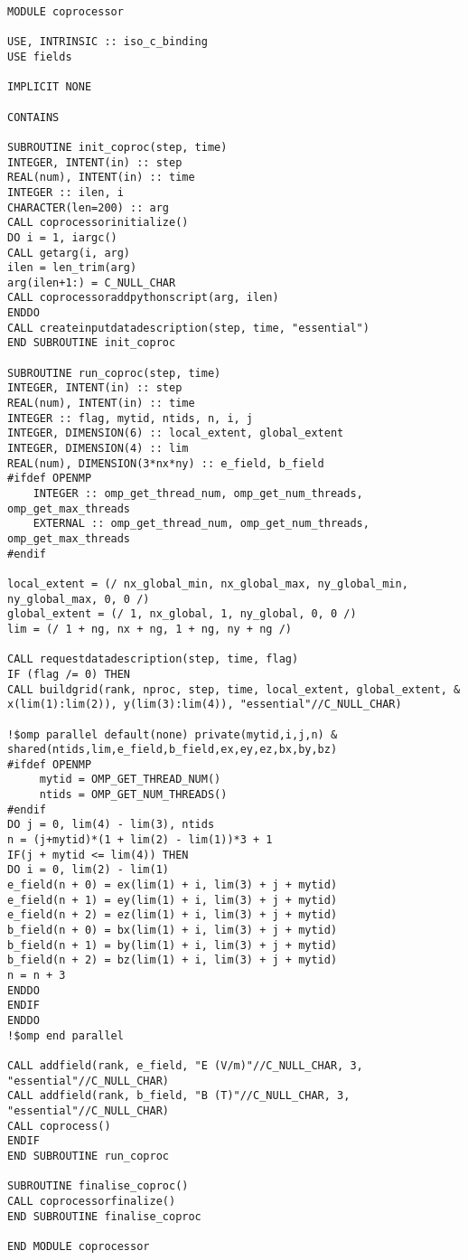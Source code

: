 \begin{lstlisting}[style=FORTRAN, caption=Fortran adaptor for ParaView Catalyst]
MODULE coprocessor

USE, INTRINSIC :: iso_c_binding
USE fields

IMPLICIT NONE

CONTAINS

SUBROUTINE init_coproc(step, time)
INTEGER, INTENT(in) :: step
REAL(num), INTENT(in) :: time
INTEGER :: ilen, i
CHARACTER(len=200) :: arg
CALL coprocessorinitialize()
DO i = 1, iargc()
CALL getarg(i, arg)
ilen = len_trim(arg)
arg(ilen+1:) = C_NULL_CHAR
CALL coprocessoraddpythonscript(arg, ilen)
ENDDO
CALL createinputdatadescription(step, time, "essential")
END SUBROUTINE init_coproc

SUBROUTINE run_coproc(step, time)
INTEGER, INTENT(in) :: step
REAL(num), INTENT(in) :: time
INTEGER :: flag, mytid, ntids, n, i, j
INTEGER, DIMENSION(6) :: local_extent, global_extent
INTEGER, DIMENSION(4) :: lim
REAL(num), DIMENSION(3*nx*ny) :: e_field, b_field
#ifdef OPENMP
    INTEGER :: omp_get_thread_num, omp_get_num_threads, omp_get_max_threads
    EXTERNAL :: omp_get_thread_num, omp_get_num_threads, omp_get_max_threads
#endif

local_extent = (/ nx_global_min, nx_global_max, ny_global_min, ny_global_max, 0, 0 /)
global_extent = (/ 1, nx_global, 1, ny_global, 0, 0 /)
lim = (/ 1 + ng, nx + ng, 1 + ng, ny + ng /)

CALL requestdatadescription(step, time, flag)
IF (flag /= 0) THEN
CALL buildgrid(rank, nproc, step, time, local_extent, global_extent, &
x(lim(1):lim(2)), y(lim(3):lim(4)), "essential"//C_NULL_CHAR)

!$omp parallel default(none) private(mytid,i,j,n) &
shared(ntids,lim,e_field,b_field,ex,ey,ez,bx,by,bz)
#ifdef OPENMP
     mytid = OMP_GET_THREAD_NUM()
     ntids = OMP_GET_NUM_THREADS()
#endif
DO j = 0, lim(4) - lim(3), ntids
n = (j+mytid)*(1 + lim(2) - lim(1))*3 + 1
IF(j + mytid <= lim(4)) THEN
DO i = 0, lim(2) - lim(1)
e_field(n + 0) = ex(lim(1) + i, lim(3) + j + mytid)
e_field(n + 1) = ey(lim(1) + i, lim(3) + j + mytid)
e_field(n + 2) = ez(lim(1) + i, lim(3) + j + mytid)
b_field(n + 0) = bx(lim(1) + i, lim(3) + j + mytid)
b_field(n + 1) = by(lim(1) + i, lim(3) + j + mytid)
b_field(n + 2) = bz(lim(1) + i, lim(3) + j + mytid)
n = n + 3
ENDDO
ENDIF
ENDDO
!$omp end parallel

CALL addfield(rank, e_field, "E (V/m)"//C_NULL_CHAR, 3, "essential"//C_NULL_CHAR)
CALL addfield(rank, b_field, "B (T)"//C_NULL_CHAR, 3, "essential"//C_NULL_CHAR)
CALL coprocess()
ENDIF
END SUBROUTINE run_coproc

SUBROUTINE finalise_coproc()
CALL coprocessorfinalize()
END SUBROUTINE finalise_coproc

END MODULE coprocessor
\end{lstlisting}

